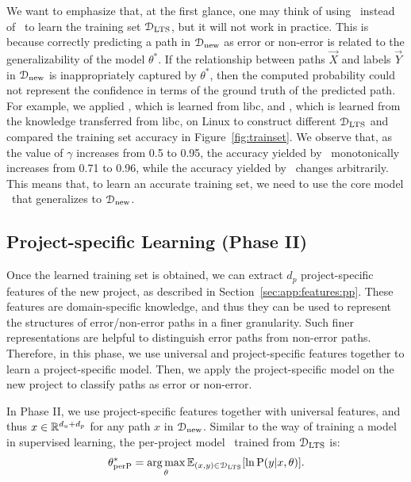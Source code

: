 \documentclass[12pt]{report}	%
\begin{document}
We want to emphasize that, at the first glance, one may think of
using \sm\ instead of \cm\ to learn the training set $\mathcal{D}_\text{LTS}$,
but it will not work in practice.
%
This is because correctly predicting a path in $\mathcal{D}_\text{new}$ as error or non-error
is related to the generalizability of the model $\theta^*$.
If the relationship between paths $\vec{X}$ and labels $\vec{Y}$  
in $\mathcal{D}_\text{new}$ is inappropriately captured by $\theta^*$,
then the computed probability could not represent the confidence
in terms of the ground truth of the predicted path.
%
For example, we applied \sm, which is learned from libc, 
and \cm, which is learned from the knowledge transferred from libc,
on Linux to construct different $\mathcal{D}_\text{LTS}$ 
and compared the training set accuracy in Figure~\ref{fig:trainset}.
We observe that, as the value of $\gamma$ increases from 0.5 to 0.95,
the accuracy yielded by \cm\ monotonically increases from 0.71 to 0.96,
while the accuracy yielded by \sm\ changes arbitrarily.
%
This means that, to learn an accurate training set,
we need to use the core model \cm\ that generalizes to $\mathcal{D}_\text{new}$.

\subsection{Project-specific Learning (Phase II)}
\label{sec:app:learning:phase2}

Once the learned training set is obtained,
we can extract $d_p$ project-specific features of the new project,
as described in Section~\ref{sec:app:features:pp}.
These features are domain-specific knowledge,
and thus they can be used to represent the structures of error/non-error paths in a finer granularity.
%
Such finer representations are helpful to distinguish error paths from non-error paths.
Therefore, in this phase, we use universal and project-specific features together to 
learn a project-specific model.
Then, we apply the project-specific model on the new project
to classify paths as error or non-error.

%
In Phase II, we use project-specific features together with universal features,
and thus $x \in \mathbb{R}^{d_u + d_p}$ for any path $x$ in $\mathcal{D}_\text{new}$.
%
Similar to the way of training a model in supervised learning,
the per-project model \ppm\ trained from $\mathcal{D}_\text{LTS}$ is:
%
\begin{equation} \label{mlphase2}
\theta_\text{perP}^*
= \operatorname*{arg\,max}_{\theta} \mathbb{E}_{(x, y) \in \mathcal{D}_\text{LTS}}[\ln \text{P} (y | x, \theta)].
\end{equation}
\end{document}
